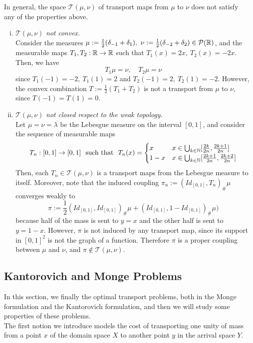 \documentclass[../main.tex]{subfiles}
\begin{document}
\begin{remark}
    In general, the space $\mathcal{T}(\mu, \nu)$ of transport maps from $\mu$ to $\nu$ does not satisfy any of the properties above.
    \begin{enumerate}[(i)]
        \item \textit{$\mathcal{T}(\mu, \nu)$ not convex.} \\
        Consider the measures $\mu := \frac{1}{2}(\delta_{-1} + \delta_1), \ \nu := \frac{1}{2}(\delta_{-2} + \delta_{2}) \in\mathcal{P}(\mathbb{R})$, and the measurable maps $T_1, T_2 : \mathbb{R}\to\mathbb{R}$ such that $T_1(x) = 2x, \ T_2(x)=-2x$. Then, we have 
        $$
        T_1\mu = \nu,  \quad T_2\mu = \nu
        $$
        since $T_1(-1)=-2, \ T_1(1)=2$ and $T_2(-1)=2, \ T_2(1)=-2$. However, the convex combination $T:= \frac{1}{2}(T_1 + T_2)$ is not a transport from $\mu$ to $\nu$, since $T(-1)=T(1)=0$.    
        
        \item \textit{$\mathcal{T}(\mu, \nu)$ not closed respect to the weak topology.} \\
        Let $\mu=\nu=\lambda$ be the Lebesgue measure on the interval $[0,1]$, and consider the sequence of measurable maps 
        \begin{align*}
            T_n: [0,1]\to[0,1] \
            \text{ such that } \
            T_n(x) = 
            \begin{cases}
                x & x\in\bigcup_{k\in\mathbb{N}} [\frac{2k}{2n}, \frac{2k+1}{2n}]\\
                1-x & x\in\bigcup_{k\in\mathbb{N}} [\frac{2k+1}{2n}, \frac{2k+2}{2n}]
            \end{cases}
        \end{align*}
        Then, each $T_n\in\mathcal{T}(\mu, \nu)$ is a transport maps from the Lebesgue measure to itself. Moreover, note that the induced coupling $\pi_n:=(Id_{[0,1]}, T_n)_\#\mu$ converges weakly to 
        $$
        \pi:=\frac{1}{2}(Id_{[0,1]}, Id_{[0,1]})_\#\mu + (Id_{[0,1]}, 1- Id_{[0,1]})_\#\mu)
        $$
        because half of the mass is sent to $y=x$ and the other half is sent to $y=1-x$. However, $\pi$ is not induced by any transport map, since its support in $[0,1]^2$ is not the graph of a function. Therefore $\pi$ is a proper coupling between $\mu$ and $\nu$, and $\pi\notin\mathcal{T}(\mu, \nu)$. 
    \end{enumerate}
\end{remark}

\subsection{Kantorovich and Monge Problems}
In this section, we finally the optimal transport problems, both in the Monge formulation and the Kantorovich formulation, and then we will study some properties of these problems.\\
The first notion we introduce models the cost of transporting one unity of mass from a point $x$ of the domain space $X$ to another point $y$ in the arrival space $Y$.
\end{document}
